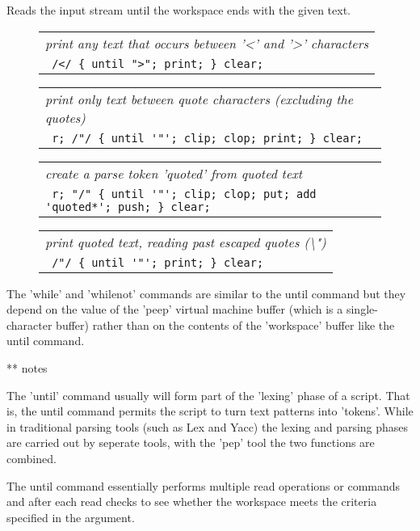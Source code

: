 \documentclass[a4paper,12pt]{article}
\begin{document}
  Reads the input stream until the workspace ends with the given
  text.
 \begin{figure}
 \begin{tabular}{ l }
 \emph{ print any text that occurs between '<' and '>' characters } \\ 
 \verb| /</ { until ">"; print; } clear; |
 \end{tabular} 
 \end{figure}
 \begin{figure}
 \begin{tabular}{ l }
 \emph{ print only text between quote characters (excluding the quotes) } \\ 
 \verb| r; /"/ { until '"'; clip; clop; print; } clear; |
 \end{tabular} 
 \end{figure}
 \begin{figure}
 \begin{tabular}{ l }
 \emph{ create a parse token 'quoted' from quoted text } \\ 
 \verb| r; "/" { until '"'; clip; clop; put; add 'quoted*'; push; } clear; |
 \end{tabular} 
 \end{figure}
 \begin{figure}
 \begin{tabular}{ l }
 \emph{ print quoted text, reading past escaped quotes (\textbackslash ") } \\ 
 \verb| /"/ { until '"'; print; } clear; |
 \end{tabular} 
 \end{figure}

  The 'while' and 'whilenot' commands are similar to the until
  command but they depend on the value of the 'peep' virtual
  machine buffer (which is a single-character buffer) rather than
  on the contents of the 'workspace' buffer like the until command.

** notes

  The 'until' command usually will form part of the 'lexing' phase
  of a script. That is, the until command permits the script to
  turn text patterns into 'tokens'. While in traditional parsing tools
  (such as Lex and Yacc) the lexing and parsing phases are carried out
  by seperate tools, with the 'pep' tool the two functions are combined.
  
  The until command essentially performs
  multiple read operations or commands and after each read checks to see
  whether the workspace meets the criteria specified in the argument.
\end{document}
